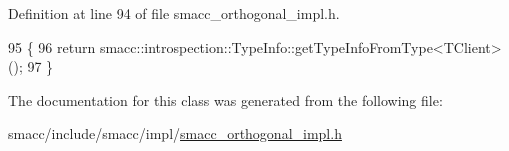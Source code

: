 Definition at line 94 of file smacc\+\_\+orthogonal\+\_\+impl.\+h.


\begin{DoxyCode}
95     \{
96         \textcolor{keywordflow}{return} smacc::introspection::TypeInfo::getTypeInfoFromType<TClient>();
97     \}
\end{DoxyCode}


The documentation for this class was generated from the following file\+:\begin{DoxyCompactItemize}
\item 
smacc/include/smacc/impl/\hyperlink{smacc__orthogonal__impl_8h}{smacc\+\_\+orthogonal\+\_\+impl.\+h}\end{DoxyCompactItemize}
